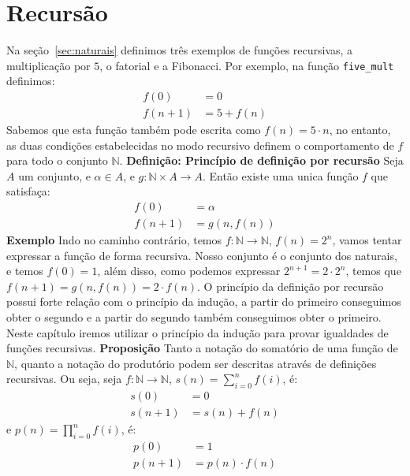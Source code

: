 \section{Recursão}
\label{sec:recursao}

Na seção~\ref{sec:naturais} definimos três exemplos de funções recursivas, a multiplicação por $5$, o fatorial e a Fibonacci.
Por exemplo, na função \lstinline{five_mult} definimos:
\begin{align*}
    f(0) &= 0  \\
     f(n+1) &= 5 + f(n) 
\end{align*}
Sabemos que esta função também pode escrita como $f(n) = 5\cdot n$, no entanto, as duas condições estabelecidas
no modo recursivo definem o comportamento de $f$ para todo o conjunto $\mathbb{N}$.
\newline \textbf{Definição: Princípio de definição por recursão} Seja $A$ um conjunto, e $\alpha \in A$,
e $g : \mathbb{N} \times A \to A$. Então existe uma unica função $f$ que satisfaça:
\begin{align*}
     f(0) &= \alpha \\
     f(n+1) &= g(n, f(n))
\end{align*} 
\textbf{Exemplo} Indo no caminho contrário, temos $f : \mathbb{N} \to \mathbb{N}$, $f(n) = 2^n$, vamos
tentar expressar a função de forma recursiva. Nosso conjunto é o conjunto dos naturais, e temos $f(0) = 1$,
além disso, como podemos expressar $2^{n+1} = 2\cdot 2^{n}$, temos que $f(n+1) = g(n, f(n)) = 2\cdot f(n)$.
\newline O princípio da definição por recursão possui forte relação com o princípio da indução, a partir do
primeiro conseguimos obter o segundo e a partir do segundo também conseguimos obter o primeiro. Neste capítulo
iremos utilizar o princípio da indução para provar igualdades de funções recursivas. 
\newline \textbf{Proposição} Tanto a notação do somatório de uma função de $\mathbb{N}$, quanto a notação
do produtório podem ser descritas através de definições recursivas. Ou seja, seja $f : \mathbb{N} \to 
\mathbb{N}$, $s(n) = \sum_{i=0}^{n} f(i)$, é:
\begin{align*}
     s(0) &= 0 \\
    s(n+1) &= s(n)+f(n)
\end{align*}
e $p(n) = \prod_{i=0}^n f(i)$, é:
\begin{align*}
    p(0) &= 1 \\
    p(n+1) &= p(n)\cdot f(n)
\end{align*}
